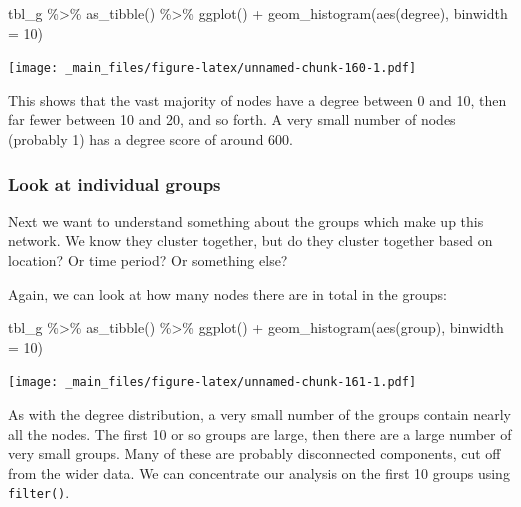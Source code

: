 \documentclass[
]{book}
\newenvironment{Shaded}{\begin{snugshade}}{\end{snugshade}}
\newcommand{\AttributeTok}[1]{\textcolor[rgb]{0.77,0.63,0.00}{#1}}
\newcommand{\DecValTok}[1]{\textcolor[rgb]{0.00,0.00,0.81}{#1}}
\newcommand{\FunctionTok}[1]{\textcolor[rgb]{0.00,0.00,0.00}{#1}}
\newcommand{\NormalTok}[1]{#1}
\newcommand{\SpecialCharTok}[1]{\textcolor[rgb]{0.00,0.00,0.00}{#1}}
\begin{document}
\begin{Shaded}
\begin{Highlighting}[]
\NormalTok{tbl\_g }\SpecialCharTok{\%\textgreater{}\%} \FunctionTok{as\_tibble}\NormalTok{() }\SpecialCharTok{\%\textgreater{}\%} 
  \FunctionTok{ggplot}\NormalTok{() }\SpecialCharTok{+} 
  \FunctionTok{geom\_histogram}\NormalTok{(}\FunctionTok{aes}\NormalTok{(degree), }\AttributeTok{binwidth =} \DecValTok{10}\NormalTok{)}
\end{Highlighting}
\end{Shaded}

\texttt{[image: \_main\_files/figure-latex/unnamed-chunk-160-1.pdf]}

This shows that the vast majority of nodes have a degree between 0 and 10, then far fewer between 10 and 20, and so forth. A very small number of nodes (probably 1) has a degree score of around 600.

\hypertarget{look-at-individual-groups}{%
\subsubsection{Look at individual groups}\label{look-at-individual-groups}}

Next we want to understand something about the groups which make up this network. We know they cluster together, but do they cluster together based on location? Or time period? Or something else?

Again, we can look at how many nodes there are in total in the groups:

\begin{Shaded}
\begin{Highlighting}[]
\NormalTok{tbl\_g }\SpecialCharTok{\%\textgreater{}\%} \FunctionTok{as\_tibble}\NormalTok{() }\SpecialCharTok{\%\textgreater{}\%} \FunctionTok{ggplot}\NormalTok{() }\SpecialCharTok{+} \FunctionTok{geom\_histogram}\NormalTok{(}\FunctionTok{aes}\NormalTok{(group), }\AttributeTok{binwidth =} \DecValTok{10}\NormalTok{)}
\end{Highlighting}
\end{Shaded}

\texttt{[image: \_main\_files/figure-latex/unnamed-chunk-161-1.pdf]}

As with the degree distribution, a very small number of the groups contain nearly all the nodes. The first 10 or so groups are large, then there are a large number of very small groups. Many of these are probably disconnected components, cut off from the wider data. We can concentrate our analysis on the first 10 groups using \texttt{filter()}.
\end{document}
